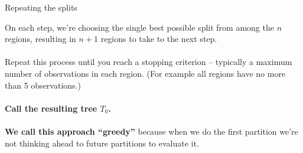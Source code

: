 \documentclass[mathserif, aspectratio=169]{beamer}
\begin{document}
\begin{frame}{Repeating the splits}

On each step, we're choosing the single best possible split from among the $n$ regions, resulting in $n+1$ regions to take to the next step. \\~\\

Repeat this process until you reach a stopping criterion -- typically a maximum number of observations in each region. (For example all regions have no more than 5 observations.) \\~\\ 

\textbf{Call the resulting tree $T_0$.} \\~\\

\textbf{We call this approach ``greedy''} because when we do the first partition we're not thinking ahead to future partitions to evaluate it.  


\end{frame}
\end{document}
